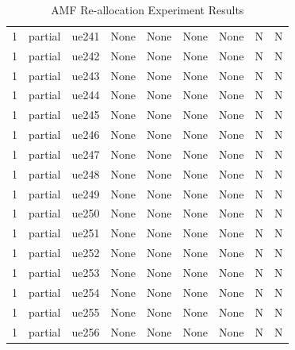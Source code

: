 \begin{table}[ht]
\begin{tabular}{|c|c|c|c|c|c|c|c|c|}
1 & partial & ue241 & None & None & None & None & N & N \\
1 & partial & ue242 & None & None & None & None & N & N \\
1 & partial & ue243 & None & None & None & None & N & N \\
1 & partial & ue244 & None & None & None & None & N & N \\
1 & partial & ue245 & None & None & None & None & N & N \\
1 & partial & ue246 & None & None & None & None & N & N \\
1 & partial & ue247 & None & None & None & None & N & N \\
1 & partial & ue248 & None & None & None & None & N & N \\
1 & partial & ue249 & None & None & None & None & N & N \\
1 & partial & ue250 & None & None & None & None & N & N \\
1 & partial & ue251 & None & None & None & None & N & N \\
1 & partial & ue252 & None & None & None & None & N & N \\
1 & partial & ue253 & None & None & None & None & N & N \\
1 & partial & ue254 & None & None & None & None & N & N \\
1 & partial & ue255 & None & None & None & None & N & N \\
1 & partial & ue256 & None & None & None & None & N & N \\
\hline
\end{tabular}
\caption{AMF Re-allocation Experiment Results}
\label{tab:amf_realloc}
\end{table}
